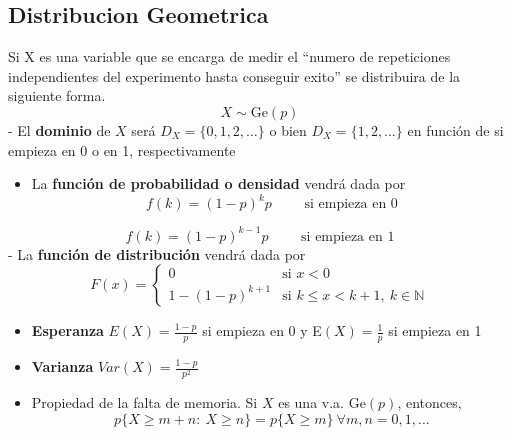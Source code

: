 \documentclass[
]{article}
\providecommand{\tightlist}{%
  \setlength{\itemsep}{0pt}\setlength{\parskip}{0pt}}
\begin{document}
\hypertarget{distribucion-geometrica}{%
\subsection{Distribucion Geometrica}\label{distribucion-geometrica}}

Si X es una variable que se encarga de medir el ``numero de repeticiones
independientes del experimento hasta conseguir exito'' se distribuira de
la siguiente forma. \[X\sim \text{Ge}(p)\] - El \textbf{dominio} de
\(X\) será \(D_X= \{0,1,2,\dots\}\) o bien \(D_X = \{1,2,\dots\}\) en
función de si empieza en 0 o en 1, respectivamente

\begin{itemize}
\tightlist
\item
  La \textbf{función de probabilidad o densidad} vendrá dada por
  \[f(k) = (1-p)^{k}p \qquad\text{ si empieza en 0}\]
\end{itemize}

\[f(k) = (1-p)^{k-1}p \qquad\text{ si empieza en 1}\] - La
\textbf{función de distribución} vendrá dada por \[F(x) = \left\{
\begin{array}{cl}
     0 & \text{si } x<0 
  \\ 1-(1-p)^{k+1} & \text{si } k\le x<k+1,\ k\in\mathbb{N}
\end{array}
\right.\]

\begin{itemize}
\tightlist
\item
  \textbf{Esperanza} \(E(X) = \frac{1-p}{p}\) si empieza en 0 y
  E\((X) = \frac{1}{p}\) si empieza en 1
\item
  \textbf{Varianza} \(Var(X) = \frac{1-p}{p^2}\)
\item
  Propiedad de la falta de memoria. Si \(X\) es una v.a.
  \(\text{Ge}(p)\), entonces,
  \[p\{X\ge m+n:\ X\ge n\} = p\{X\ge m\}\ \forall m,n=0,1,\dots\]
\end{itemize}
\end{document}
